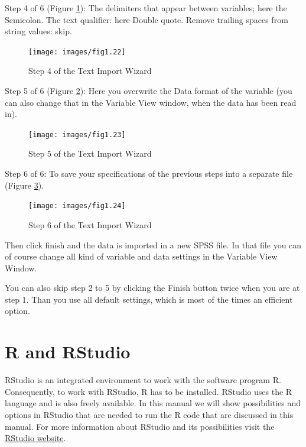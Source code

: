 \documentclass[
]{book}
\begin{document}
Step 4 of 6 (Figure \ref{fig:fig22}):
The delimiters that appear between variables; here the Semicolon.
The text qualifier: here Double quote.
Remove trailing spaces from string values: skip.

\begin{figure}

{\centering \texttt{[image: images/fig1.22]} 

}

\caption{Step 4 of the Text Import Wizard}\label{fig:fig22}
\end{figure}

Step 5 of 6 (Figure \ref{fig:fig23}):
Here you overwrite the Data format of the variable (you can also change that in the Variable View window, when the data has been read in).

\begin{figure}

{\centering \texttt{[image: images/fig1.23]} 

}

\caption{Step 5 of the Text Import Wizard}\label{fig:fig23}
\end{figure}

Step 6 of 6:
To save your specifications of the previous steps into a separate file (Figure \ref{fig:fig24}).

\begin{figure}

{\centering \texttt{[image: images/fig1.24]} 

}

\caption{Step 6 of the Text Import Wizard}\label{fig:fig24}
\end{figure}

Then click finish and the data is imported in a new SPSS file. In that file you can of course change all kind of variable and data settings in the Variable View Window.

You can also skip step 2 to 5 by clicking the Finish button twice when you are at step 1. Than you use all default settings, which is most of the times an efficient option.

\hypertarget{r-and-rstudio}{%
\section{R and RStudio}\label{r-and-rstudio}}

RStudio is an integrated environment to work with the software program R. Consequently, to work with RStudio, R has to be installed. RStudio uses the R language and is also freely available. In this manual we will show possibilities and options in RStudio that are needed to run the R code that are discussed in this manual. For more information about RStudio and its possibilities visit the \href{https://www.rstudio.com/}{RStudio website}.
\end{document}
